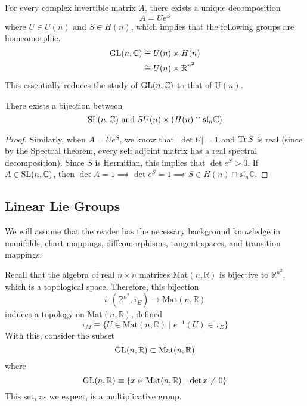   \begin{corollary}
    For every complex invertible matrix $A$, there exists a unique decomposition
    \begin{equation}
      A = U e^S
    \end{equation}
    where $U \in U(n)$ and $S \in H(n)$, which implies that the following groups are homeomorphic. 
    \begin{align*}
      \operatorname{GL}(n, \mathbb{C}) & \cong U(n) \times H(n) \\
      & \cong U(n) \times \mathbb{R}^{n^2}
    \end{align*} 
    This essentially reduces the study of $\operatorname{GL}(n, \mathbb{C})$ to that of U$(n)$. 
  \end{corollary}

  \begin{corollary}
    There exists a bijection between 
    \begin{equation}
      \operatorname{SL}(n, \mathbb{C}) \text{ and } SU(n) \times (H(n) \cap \mathfrak{sl}_n \mathbb{C})
    \end{equation}
  \end{corollary}
  \begin{proof}
    Similarly, when $A = U e^S$, we know that $|\det{U}| = 1$ and $\operatorname{Tr}{S}$ is real (since by the Spectral theorem, every self adjoint matrix has a real spectral decomposition). Since $S$ is Hermitian, this implies that $\det{e^S} > 0$. If $A \in \operatorname{SL}(n, \mathbb{C})$, then $\det{A} = 1 \implies \det{e^S} = 1 \implies S \in H(n) \cap \mathfrak{sl}_n \mathbb{C}$. 
  \end{proof}

\subsection{Linear Lie Groups}

  We will assume that the reader has the necessary background knowledge in manifolds, chart mappings, diffeomorphisms, tangent spaces, and transition mappings. 

  Recall that the algebra of real $n \times n$ matrices Mat$(n, \mathbb{R})$ is bijective to $\mathbb{R}^{n^2}$, which is a topological space. Therefore, this bijection 
  \begin{equation}
    i:(\mathbb{R}^{n^2}, \tau_E) \rightarrow \text{Mat}(n, \mathbb{R})
  \end{equation}
  induces a topology on Mat$(n, \mathbb{R})$, defined 
  \begin{equation}
    \tau_M \equiv \{U \in \text{Mat}(n, \mathbb{R}) \; | \; e^{-1} (U) \in \tau_E\}
  \end{equation}
  With this, consider the subset
  \begin{equation}
    \operatorname{GL}(n, \mathbb{R}) \subset \text{Mat}(n, \mathbb{R})
  \end{equation}
  where
  \begin{equation}
    \operatorname{GL}(n, \mathbb{R}) \equiv \{x \in \text{Mat}(n, \mathbb{R}) \;|\; \det{x} \neq 0\}
  \end{equation}
  This set, as we expect, is a multiplicative group. 

